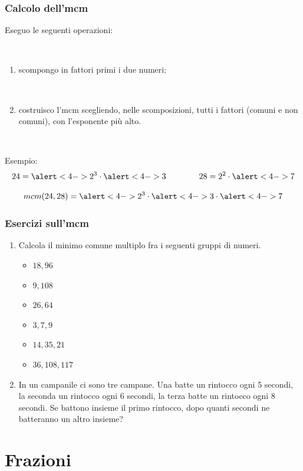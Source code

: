 \documentclass[]{beamer}
\theoremstyle{plain}
\begin{document}
\begin{frame}
\frametitle{Calcolo dell'mcm}
Eseguo le seguenti operazioni:

~

\begin{enumerate}
  \item \alert{scompongo in fattori primi} i due numeri;\pause
  
  ~
  \item costruisco l'mcm scegliendo, nelle scomposizioni, \alert{tutti i fattori (comuni e non comuni), con l'esponente più alto}.\pause
\end{enumerate}

~

Esempio:\[24 = \alert<4->{2^3} \cdot \alert<4->{3} \qquad\qquad 28 = 2^2 \cdot \alert<4->{7} \]\pause

\[ mcm(24, 28) = \alert<4->{2^3} \cdot \alert<4->{3} \cdot \alert<4->{7} \]
\end{frame}




\begin{frame}
\frametitle{Esercizi sull'mcm}
\begin{enumerate}
    \item Calcola il minimo comune multiplo fra i seguenti gruppi di numeri.
    \begin{multicols}{2}
      \begin{itemize}
          \item $ 18, 96 $
          \item $ 9, 108 $
          \item $ 26, 64 $
          \item $ 3, 7, 9 $
          \item $ 14, 35, 21 $
          \item $ 36, 108, 117 $
      \end{itemize}
    \end{multicols}
    \item In un campanile ci sono tre campane. Una batte un rintocco ogni 5 secondi, la seconda un rintocco ogni 6 secondi, la terza batte un rintocco ogni 8 secondi. Se battono insieme il primo rintocco, dopo quanti secondi ne batteranno un altro insieme?
\end{enumerate}
\end{frame}
  



\section{Frazioni}
\end{document}
